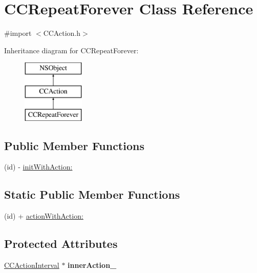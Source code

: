 \hypertarget{interface_c_c_repeat_forever}{\section{C\-C\-Repeat\-Forever Class Reference}
\label{interface_c_c_repeat_forever}
}


{\ttfamily \#import $<$C\-C\-Action.\-h$>$}

Inheritance diagram for C\-C\-Repeat\-Forever\-:\begin{figure}[H]
\begin{center}
\leavevmode
\includegraphics[height=3.000000cm]{interface_c_c_repeat_forever}
\end{center}
\end{figure}
\subsection*{Public Member Functions}
\begin{DoxyCompactItemize}
\item 
(id) -\/ \hyperlink{interface_c_c_repeat_forever_a53dc06b36b3ff4550dcad1ad3ad96923}{init\-With\-Action\-:}
\end{DoxyCompactItemize}
\subsection*{Static Public Member Functions}
\begin{DoxyCompactItemize}
\item 
(id) + \hyperlink{interface_c_c_repeat_forever_a411554b9ebf11782289f30032cf8f2e7}{action\-With\-Action\-:}
\end{DoxyCompactItemize}
\subsection*{Protected Attributes}
\begin{DoxyCompactItemize}
\item 
\hypertarget{interface_c_c_repeat_forever_a3352f652ee5529df550b4291bc823554}{\hyperlink{class_c_c_action_interval}{C\-C\-Action\-Interval} $\ast$ {\bfseries inner\-Action\-\_\-}}\label{interface_c_c_repeat_forever_a3352f652ee5529df550b4291bc823554}

\end{DoxyCompactItemize}
